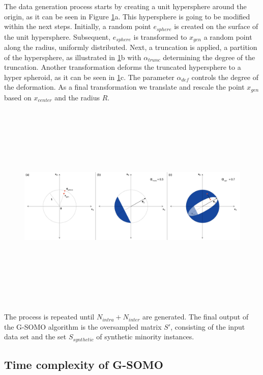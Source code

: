 \documentclass[parskip=full]{scrartcl}
\begin{document}
The data generation process starts by creating a unit hypersphere around the origin, as it can be seen in Figure \ref{fig:Hypersphere}a. This hypersphere is going to be modified within the next steps. Initially, a random point $e_{sphere}$ is created on the surface of the unit hypersphere. Subsequent, $e_{sphere}$ is transformed to $x_{gen}$ a random point along the radius, uniformly distributed. Next, a truncation is applied, a partition of the hypersphere, as illustrated in \ref{fig:Hypersphere}b with $\alpha_{trunc}$ determining the degree of the truncation. Another transformation deforms the truncated hypersphere to a hyper spheroid, as it can be seen in \ref{fig:Hypersphere}c. The parameter $\alpha_{def}$ controls the degree of the deformation.  As a final transformation we translate and rescale the point $x_{gen}$ based on $x_{center}$ and the radius $R$.

\begin{figure}[H]
	\centering
	\includegraphics[width=15cm,height=10cm, keepaspectratio]{../../analysis/gsomo/fig6.png}
	\label{fig:Hypersphere}
\end{figure}

The process is repeated until $N_{intra} + N_{inter}$ are generated. The final output of the G-SOMO algorithm is the oversampled matrix $S'$, consisting of the input data set and the set $S_{synthetic}$ of synthetic minority instances.

\subsection{Time complexity of G-SOMO}
\end{document}
